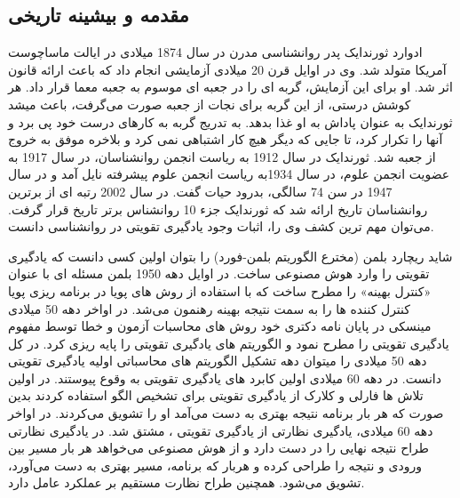  \subsection{مقدمه و بیشینه تاریخی}
 ادوارد ثورندایک پدر روانشناسی مدرن در سال 1874 میلادی در ایالت ماساچوست آمریکا متولد شد. وی در اوایل قرن 20 میلادی آزمایشی انجام داد که باعث ارائه قانون اثر شد. او برای این آزمایش، گربه ای را در جعبه ای موسوم به جعبه معما قرار داد. هر کوشش درستی، از این گربه برای نجات از جعبه صورت می‌گرفت، باعث میشد ثورندایک به عنوان پاداش به او غذا بدهد. به تدریج گربه به کارهای درست خود پی برد و آنها را تکرار کرد، تا جایی که دیگر هیچ کار اشتباهی نمی کرد و بلاخره موفق به خروج از جعبه شد. ثورندایک در سال 1912 به ریاست انجمن روانشناسان، در سال 1917 به عضویت انجمن علوم، در سال 1934به ریاست انجمن علوم پیشرفته نایل آمد و در سال 1947 در سن 74 سالگی، بدرود حیات گفت. در سال 2002 رتبه ای از برترین روانشناسان تاریخ ارائه شد که ثورندایک جزء 10 روانشناس برتر تاریخ قرار گرفت. می‌توان مهم ترین کشف وی را، اثبات وجود یادگیری تقویتی در روانشناسی دانست.
 
 شاید ریچارد بلمن (مخترع الگوریتم بلمن-فورد) را بتوان اولین کسی دانست که یادگیری تقویتی را وارد هوش مصنوعی ساخت. در اوایل دهه 1950 بلمن مسئله ای با عنوان «کنترل بهینه» را مطرح ساخت که با استفاده از روش های پویا در برنامه ریزی پویا کنترل کننده ها را به سمت نتیجه بهینه رهنمون می‌شد. در اواخر دهه 50 میلادی مینسکی در پایان نامه دکتری خود روش های محاسبات آزمون و خطا توسط مفهوم یادگیری تقویتی را مطرح نمود و الگوریتم های یادگیری تقویتی را پایه ریزی کرد. در کل دهه 50 میلادی را میتوان دهه تشکیل الگوریتم های محاسباتی اولیه یادگیری تقویتی دانست. در دهه 60 میلادی اولین کابرد های یادگیری تقویتی به وقوع پیوستند. در اولین تلاش ها فارلی و کلارک از یادگیری تقویتی برای تشخیص الگو استفاده کردند بدین صورت که هر بار برنامه نتیجه بهتری به دست می‌آمد او را تشویق می‌کردند. در اواخر دهه 60 میلادی، یادگیری نظارتی از یادگیری تقویتی ، مشتق شد. در یادگیری نظارتی طراح نتیجه نهایی را در دست دارد و از هوش مصنوعی می‌خواهد هر بار مسیر بین ورودی و نتیجه را طراحی کرده و هربار که برنامه، مسیر بهتری به دست می‌آورد، تشویق می‌شود. همچنین طراح نظارت مستقیم بر عملکرد عامل دارد.
 